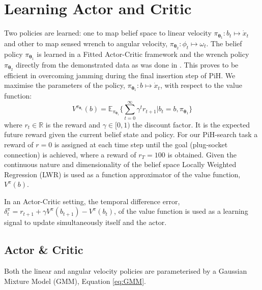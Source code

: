 \documentclass[final,5p,times,twocolumn]{elsarticle}
\newcommand{\Param}{\boldsymbol{\theta}}
\begin{document}
\section{Learning Actor and Critic}\label{sec:learning-value-actor}

Two policies are learned: one to map belief space 
to linear velocity $\pi_{\Param_1} : b_t \mapsto \dot{x}_t$ and other to map sensed wrench to angular 
velocity, $ \pi_{\Param_2} : \phi_t \mapsto \omega_t$. The belief policy $\pi_{\Param_1}$ is learned in a Fitted Actor-Critic framework 
and the wrench policy $\pi_{\Param_2}$ directly from the demonstrated data as was done 
in \cite[Chap. 5]{Kronander2015}. This proves to be efficient in overcoming jamming during the final insertion step of PiH. 
We maximise the parameters of the policy, $\pi_{\Param_1}: b \mapsto \dot{x}_t$, 
with respect to the value function:
\begin{equation}\label{eq:value_function}
  V^{\pi_{\Param_1}}(b) = \mathbb{E}_{\pi_{\Param_1}}\Bigg\{ \sum_{t=0}^{\infty} \gamma^{t} r_{t+1} | b_t=b,\pi_{\Param_1}\Bigg\}
\end{equation}
where $r_t \in \mathbb{R}$ is the reward and $\gamma \in [0,1)$ the discount factor. It is the expected future reward given the current 
belief state and policy. For our PiH-search task a reward of ${r=0}$ is assigned at each time step until the goal
(plug-socket connection) is achieved, where a reward of $r_{T}=100$ is obtained. Given the continuous nature and 
dimensionality of the belief space Locally Weighted Regression \cite{Atkeson97locallyweighted} (LWR) is used as a function 
approximator of the value function, $V^{\pi}(b)$.

In an Actor-Critic setting, the temporal difference error, ${\delta^{\pi}_t = r_{t+1} + \gamma V^{\pi}(b_{t+1}) - V^{\pi}(b_t)}$, of the value 
function is used as a learning signal to update simultaneously itself and the actor.

\subsection{Actor \& Critic}
Both the linear and angular velocity policies are parameterised by a Gaussian Mixture Model (GMM), Equation \ref{eq:GMM}.
\end{document}
